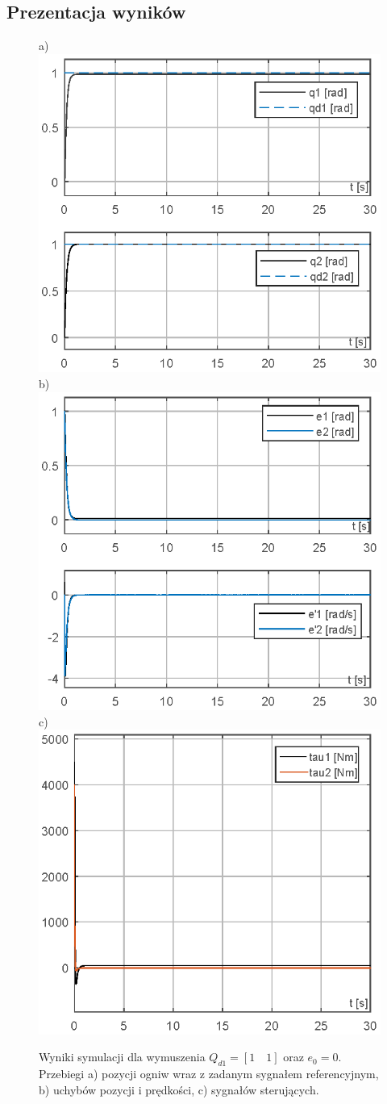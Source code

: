 \documentclass[12pt, a4paper, polish]{article}
\begin{document}
\subsection{Prezentacja wyników}
	\begin{figure}[H]\centering
	a) \includegraphics[width=0.30\columnwidth]{SRManCw5/SRManCw5_ZADANIE2/figs/01Pozycje_e0} b)\includegraphics[width=0.30\columnwidth]{SRManCw5/SRManCw5_ZADANIE2/figs/01Uchyby_e0} c)\includegraphics[width=0.30\columnwidth]{SRManCw5/SRManCw5_ZADANIE2/figs/01Sygnal_e0}\caption{
		Wyniki symulacji dla wymuszenia $Q_{d1}=[1\quad1]$ oraz $e_0=0$. Przebiegi a) pozycji ogniw wraz z zadanym sygnałem referencyjnym, b) uchybów pozycji i prędkości, c)  sygnałów sterujących.}
\end{figure}
\end{document}
